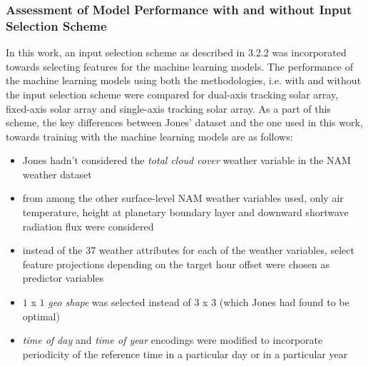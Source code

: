 \vspace{0.3cm}
\subsubsection*{Assessment of Model Performance with and without Input Selection Scheme}
\par In this work, an input selection scheme as described in 3.2.2 was incorporated towards selecting features for the machine learning models. The performance of the machine learning models using both the methodologies, i.e. with and without the input selection scheme were compared for dual-axis tracking solar array, fixed-axis solar array and single-axis tracking solar array. As a part of this scheme, the key differences between Jones' dataset and the one used in this work, towards training with the machine learning models are as follows:
\begin{itemize}
    \itemsep0em
    \item Jones \cite{thesis_zach} hadn't considered the \textit{total cloud cover} weather variable in the NAM weather dataset
    \item from among the other surface-level NAM weather variables used, only air temperature, height at planetary boundary layer and downward shortwave radiation flux were considered
    \item instead of the 37 weather attributes for each of the weather variables, select feature projections depending on the target hour offset were chosen as predictor variables
    \item $1$ x $1$ \textit{geo shape} was selected instead of $3$ x $3$ (which Jones \cite{thesis_zach} had found to be optimal)
    \item \textit{time of day} and \textit{time of year} encodings were modified to incorporate periodicity of the reference time in a particular day or in a particular year
\end{itemize}


